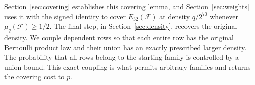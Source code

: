 Section~\ref{sec:covering} establishes this covering lemma, and
Section~\ref{sec:weights} uses it with the signed identity to cover
$E_{32}(\mathcal F)$ at density $q/2^{70}$ whenever
$\mu_q(\mathcal F)\ge1/2$. The final step, in
Section~\ref{sec:density}, recovers the original density. We couple
dependent rows so that each entire row has the original Bernoulli product
law and their union has an exactly prescribed larger density. The
probability that all rows belong to the starting family is controlled by
a union bound. This exact coupling is what permits arbitrary families
and returns the covering cost to $p$.
